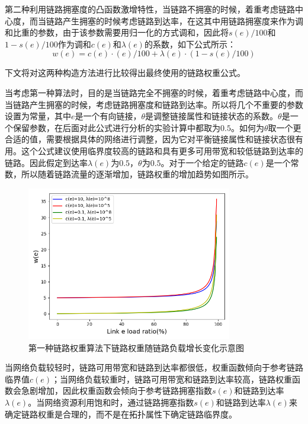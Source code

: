 第二种利用链路拥塞度的凸函数激增特性，当链路不拥塞的时候，着重考虑链路中心度，而当链路产生拥塞的时候考虑链路到达率，在这其中用链路拥塞度来作为调和比重的参数，由于该参数需要用归一化的方式调和，因此将$s(e)/100$和$1-s(e)/100$作为调和$c(e)$和$\lambda(e)$的系数，如下公式所示：
$$w(e) = c(e) \cdot (e)/100 + \lambda(e) \cdot (1-s(e)/100)$$

下文将对这两种构造方法进行比较得出最终使用的链路权重公式。

当考虑第一种算法时，目的是当链路完全不拥塞的时候，着重考虑链路中心度，而当链路产生拥塞的时候，考虑链路拥塞度和链路到达率。所以将几个不重要的参数设置为常量，其中$e$是一个有向链接，$\theta$是调整链接属性和链接状态的系数。$\theta$是一个保留参数，在后面对此公式进行分析的实验计算中都取为$0.5$。如何为$\theta$取一个更合适的值，需要根据具体的网络进行调整，因为它对平衡链接属性和链接状态很有用。这个公式建议使用临界度较高的链路和具有更多可用带宽和较低链路到达率的链路。因此假定到达率$\lambda\left(e\right)$为$0.5$，$\theta$为$0.5$。对于一个给定的链路$c\left(e\right)$是一个常数，所以随着链路流量的逐渐增加，链路权重的增加趋势如图所示。

\begin{figure}[htbp]
\setlength{\abovecaptionskip}{15pt plus 3pt minus 2pt}
\centerline{\includegraphics[width=0.8\textwidth]{./figures/ch3-link-weight-function-1.png}}
\caption{第一种链路权重算法下链路权重随链路负载增长变化示意图}
\label{fig-ch3-link-weight-function-1}
\end{figure}

当网络负载较轻时，链路可用带宽和链路到达率都很低，权重函数倾向于参考链路临界值$c\left(e\right)$；当网络负载较重时，链路可用带宽和链路到达率较高，链路权重函数会急剧增加，因此权重函数会倾向于参考链路拥塞指数$s\left(e\right)$和链路到达率$\lambda\left(e\right)$。当网络资源利用饱和时，通过链路拥塞指数$s\left(e\right)$和链路到达率$\lambda\left(e\right)$来确定链路权重是合理的，而不是在拓扑属性下确定链路临界度。

